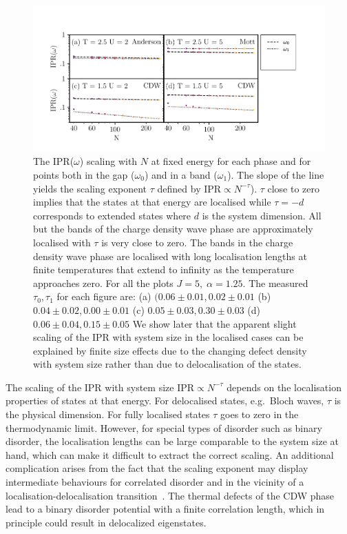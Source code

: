 \hypertarget{fig:IPR_scaling}{%
\begin{figure}
\centering
\includegraphics[width=1\textwidth,height=\textheight]{figure_code/fk_chapter/DOS/IPR_scaling}
\caption[{Scaling of IPR(\(\omega\)) against system size \(N\).}]{The IPR(\(\omega\)) scaling with \(N\) at fixed energy for each phase and for points both in the gap (\(\omega_0\)) and in a band (\(\omega_1\)). The slope of the line yields the scaling exponent \(\tau\) defined by \(\mathrm{IPR} \propto N^{-\tau}\)). \(\tau\) close to zero implies that the states at that energy are localised while \(\tau = -d\) corresponds to extended states where \(d\) is the system dimension. All but the bands of the charge density wave phase are approximately localised with \(\tau\) is very close to zero. The bands in the charge density wave phase are localised with long localisation lengths at finite temperatures that extend to infinity as the temperature approaches zero. For all the plots \(J = 5,\;\alpha = 1.25\). The measured \(\tau_0,\tau_1\) for each figure are: (a) \((0.06\pm0.01, 0.02\pm0.01\) (b) \(0.04\pm0.02, 0.00\pm0.01\) (c) \(0.05\pm0.03, 0.30\pm0.03\) (d) \(0.06\pm0.04, 0.15\pm0.05\) We show later that the apparent slight scaling of the IPR with system size in the localised cases can be explained by finite size effects due to the changing defect density with system size rather than due to delocalisation of the states.}
\label{fig:IPR_scaling}
\end{figure}
}

The scaling of the IPR with system size \(\mathrm{IPR} \propto N^{-\tau}\) depends on the localisation properties of states at that energy. For delocalised states, e.g.~Bloch waves, \(\tau\) is the physical dimension. For fully localised states \(\tau\) goes to zero in the thermodynamic limit. However, for special types of disorder such as binary disorder, the localisation lengths can be large comparable to the system size at hand, which can make it difficult to extract the correct scaling. An additional complication arises from the fact that the scaling exponent may display intermediate behaviours for correlated disorder and in the vicinity of a localisation-delocalisation transition~\autocite{kramerLocalizationTheoryExperiment1993,eversAndersonTransitions2008}. The thermal defects of the CDW phase lead to a binary disorder potential with a finite correlation length, which in principle could result in delocalized eigenstates.

